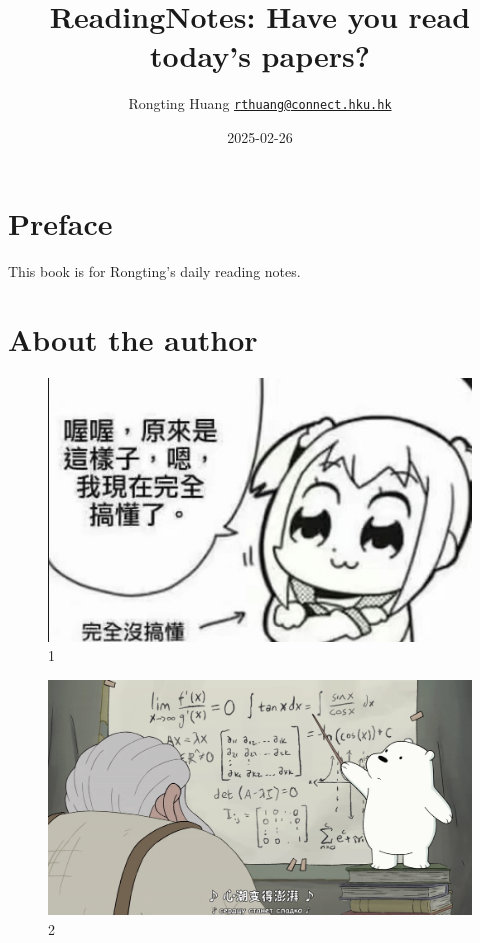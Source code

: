 \documentclass[
]{book}
\title{ReadingNotes: Have you read today's papers?}
\author{Rongting Huang \href{mailto:rthuang@connect.hku.hk}{\nolinkurl{rthuang@connect.hku.hk}}}
\date{2025-02-26}
\begin{document}
\maketitle

{
\setcounter{tocdepth}{1}
\tableofcontents
}
\hypertarget{preface}{%
\chapter*{Preface}\label{preface}}

This book is for Rongting's daily reading notes.

\hypertarget{about-the-author}{%
\chapter*{About the author}\label{about-the-author}}

\begin{figure}
\centering
\includegraphics{./figs/Rongting/IMG-5393.jpg}
\caption{1}
\end{figure}

\begin{figure}
\centering
\includegraphics{./figs/Rongting/IMG-6316.PNG}
\caption{2}
\end{figure}
\end{document}
